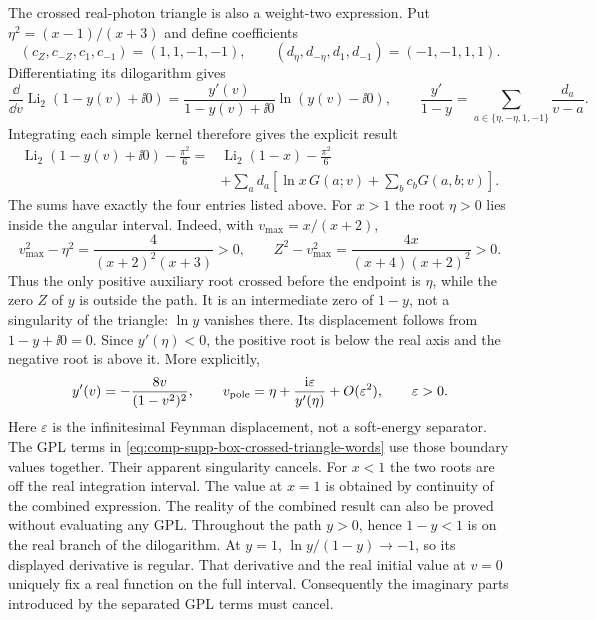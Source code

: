 The crossed real-photon triangle is also a weight-two expression.
Put $\eta^2=(x-1)/(x+3)$ and define coefficients
\begin{equation}
 (c_Z,c_{-Z},c_1,c_{-1})=(1,1,-1,-1),\qquad
 (d_\eta,d_{-\eta},d_1,d_{-1})=(-1,-1,1,1).
\end{equation}
Differentiating its dilogarithm gives
\begin{equation}
 \frac{\dd}{\dd v}\operatorname{Li}_2(1-y(v)+\ii0)
 =\frac{y'(v)}{1-y(v)+\ii0}\ln(y(v)-\ii0),\qquad
 \frac{y'}{1-y}=\sum_{a\in\{\eta,-\eta,1,-1\}}\frac{d_a}{v-a}.
\end{equation}
Integrating each simple kernel therefore gives the explicit result
\begin{equation}
 \begin{aligned}
 \operatorname{Li}_2(1-y(v)+\ii0)-\frac{\pi^2}{6}
 ={}&\operatorname{Li}_2(1-x)-\frac{\pi^2}{6}\\
 &+\sum_a d_a\left[\ln x\,G(a;v)
                +\sum_b c_bG(a,b;v)\right].
 \end{aligned}
 \label{eq:comp-supp-box-crossed-triangle-words}
\end{equation}
The sums have exactly the four entries listed above.
For $x>1$ the root $\eta>0$ lies inside the angular interval.
Indeed, with $v_{\max}=x/(x+2)$,
\begin{equation}
 v_{\max}^2-\eta^2=\frac{4}{(x+2)^2(x+3)}>0,\qquad
 Z^2-v_{\max}^2=\frac{4x}{(x+4)(x+2)^2}>0.
\end{equation}
Thus the only positive auxiliary root crossed before the endpoint
is $\eta$, while the zero $Z$ of $y$ is outside the path.
It is an intermediate zero of $1-y$, not a singularity of the
triangle: $\ln y$ vanishes there. Its displacement follows from
$1-y+\ii0=0$. Since $y'(\eta)<0$, the positive root is below
the real axis and the negative root is above it. More explicitly,
\begin{equation}
 y'(v)=-\frac{8v}{(1-v^2)^2},\qquad
 v_{\rm pole}=\eta+\frac{\mathrm{i}\varepsilon}{y'(\eta)}
                   +O(\varepsilon^2),\qquad \varepsilon>0.
\end{equation}
Here $\varepsilon$ is the infinitesimal Feynman displacement, not
a soft-energy separator. The GPL terms
in \eqref{eq:comp-supp-box-crossed-triangle-words} use those
boundary values together. Their apparent singularity cancels.
For $x<1$ the two roots are off the real integration interval.
The value at $x=1$ is obtained by continuity of the combined
expression. The reality of the combined result can also be proved
without evaluating any GPL. Throughout the path $y>0$, hence
$1-y<1$ is on the real branch of the dilogarithm. At $y=1$,
$\ln y/(1-y)\to-1$, so its displayed derivative is regular.
That derivative and the real initial value at $v=0$ uniquely fix
a real function on the full interval. Consequently the imaginary
parts introduced by the separated GPL terms must cancel.


